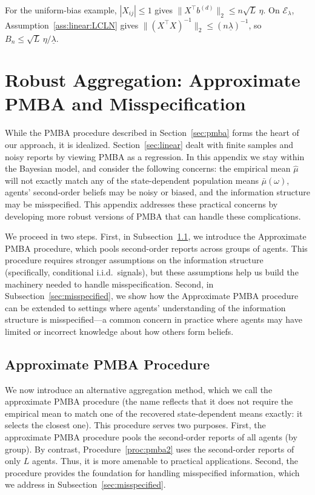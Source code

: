 \documentclass[12pt,reqno]{amsart}
\begin{document}
For the uniform-bias example, $|X_{ij}|\leq1$ gives
$\|X^{\top}b^{(d)}\|_2\leq n\sqrt L\,\eta$.
On $\mathcal{E}_\lambda$, Assumption~\ref{ass:linear:LCLN} gives
$\|(X^{\top}X)^{-1}\|_2\leq(n\underline\lambda)^{-1}$,
so $B_n\leq\sqrt L\,\eta/\underline\lambda$.
\par\endgroup

\section{Robust Aggregation: Approximate PMBA and Misspecification}\label{sec:robust}
While the PMBA procedure described in Section~\ref{sec:pmba} forms the heart of our approach,  it is idealized. Section~\ref{sec:linear} dealt with finite samples and noisy reports by viewing PMBA as a regression. In this appendix we stay within the Bayesian model, and consider the following concerns: the empirical mean $\hat{\mu}$ will not exactly match any of the state-dependent population means $\bar{\mu}(\omega)$, agents' second-order beliefs may be noisy or biased, and the information structure may be misspecified.  This appendix addresses these practical concerns by developing more robust versions of PMBA that can handle these complications.

We proceed in two steps. First, in Subsection~\ref{sec:APMBA}, we introduce the Approximate PMBA procedure,  which pools second-order reports across groups of agents. This procedure requires stronger assumptions on the information structure (specifically, conditional i.i.d.\ signals), but these assumptions help us build the machinery needed to handle misspecification. Second, in Subsection~\ref{sec:misspecified}, we show how the Approximate PMBA procedure can be extended to settings where agents' understanding of the information structure is misspecified---a common concern in practice where agents may have limited or incorrect knowledge about how others form beliefs.

\subsection{Approximate PMBA Procedure}\label{sec:APMBA}
We now introduce an alternative aggregation method, which we call the approximate PMBA procedure (the name reflects that it does not require the empirical mean to match one of the recovered state-dependent means exactly: it selects the closest one). This procedure serves two purposes.  First, the approximate PMBA procedure pools the second-order reports of all agents (by group). By contrast, Procedure~\ref{proc:pmba2} uses the second-order reports of only $L$ agents. Thus, it is more amenable to practical applications. Second, the procedure provides the foundation for handling misspecified information, which we address in Subsection~\ref{sec:misspecified}.
\end{document}

